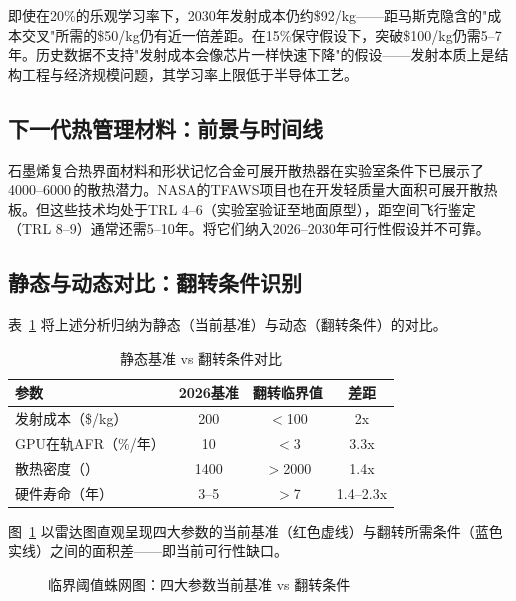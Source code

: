 即使在20\%的乐观学习率下，2030年发射成本仍约\$92/kg——距马斯克隐含的"成本交叉"所需的\$50/kg仍有近一倍差距。在15\%保守假设下，突破\$100/kg仍需5--7年。历史数据不支持"发射成本会像芯片一样快速下降"的假设——发射本质上是结构工程与经济规模问题，其学习率上限低于半导体工艺。

\subsection{下一代热管理材料：前景与时间线}

石墨烯复合热界面材料\cite{esa2017graphene,scalia2023graphene,kanti2025graphene}和形状记忆合金可展开散热器\cite{pennstate2024sma,act2026deployable}在实验室条件下已展示了4000--6000\,\unitWpm{}的散热潜力。NASA的TFAWS项目\cite{nasa2024tfaws,nasatfaws2024ti}也在开发轻质量大面积可展开散热板。但这些技术均处于TRL 4--6（实验室验证至地面原型），距空间飞行鉴定（TRL 8--9）通常还需5--10年。将它们纳入2026--2030年可行性假设并不可靠。

\subsection{静态与动态对比：翻转条件识别}

表~\ref{tab:static_dynamic} 将上述分析归纳为静态（当前基准）与动态（翻转条件）的对比。

\begin{table}[H]
\centering
\footnotesize
\caption{静态基准 vs 翻转条件对比}
\label{tab:static_dynamic}
\begin{tabular}{lccc}
\toprule
\textbf{参数} & \textbf{2026基准} & \textbf{翻转临界值} & \textbf{差距} \\
\midrule
发射成本（\$/kg） & 200 & $<$100 & 2x \\
GPU在轨AFR（\%/年） & 10 & $<$3 & 3.3x \\
散热密度（\unitWpm{}） & 1400 & $>$2000 & 1.4x \\
硬件寿命（年） & 3--5 & $>$7 & 1.4--2.3x \\
\bottomrule
\end{tabular}
\end{table}

图~\ref{fig:threshold_radar} 以雷达图直观呈现四大参数的当前基准（红色虚线）与翻转所需条件（蓝色实线）之间的面积差——即当前可行性缺口。

\begin{figure}[H]
\centering

\caption{临界阈值蛛网图：四大参数当前基准 vs 翻转条件}
\label{fig:threshold_radar}
\end{figure}

